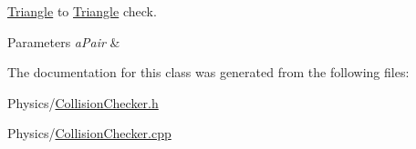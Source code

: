 \hyperlink{structTriangle}{Triangle} to \hyperlink{structTriangle}{Triangle} check. 


\begin{DoxyParams}{Parameters}
{\em a\+Pair} & \\
\hline
\end{DoxyParams}


The documentation for this class was generated from the following files\+:\begin{DoxyCompactItemize}
\item 
Physics/\hyperlink{CollisionChecker_8h}{Collision\+Checker.\+h}\item 
Physics/\hyperlink{CollisionChecker_8cpp}{Collision\+Checker.\+cpp}\end{DoxyCompactItemize}
